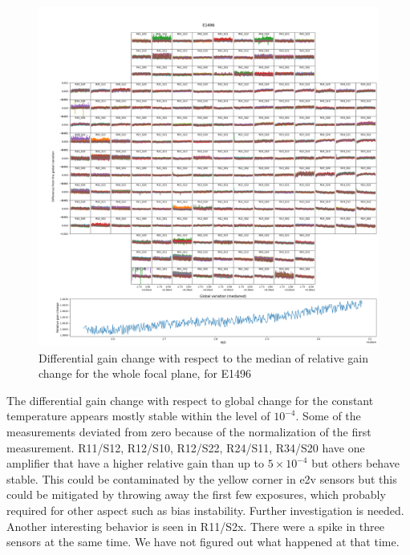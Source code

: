 \begin{figure}[ht]
    \centering
    \includegraphics[width=1\linewidth]{figures/gaintemp/E1496gainoverall_global.png}
    \caption{Differential gain change with respect to the median of relative gain change for the whole focal plane, for E1496}
    \label{fig:relative-gain-E1496}
\end{figure}
The differential gain change with respect to global change for the constant temperature appears mostly stable within the level of $10^{-4}$. Some of the measurements deviated from zero because of the normalization of the first measurement. R11/S12, R12/S10, R12/S22, R24/S11, R34/S20 have one amplifier that have a higher relative gain than up to $5\times 10^{-4}$ but others behave stable. This could be contaminated by the yellow corner in e2v sensors but this could be mitigated by throwing away the first few exposures, which probably required for other aspect such as bias instability. Further investigation is needed. Another interesting behavior is seen in R11/S2x. There were a spike in three sensors at the same time. We have not figured out what happened at that time.


